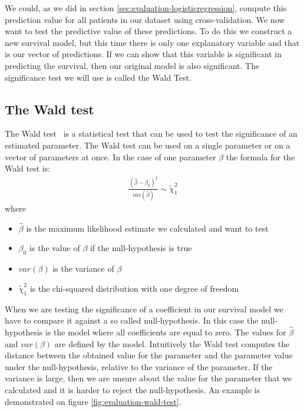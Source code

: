  We could, as we did in section \ref{sec:evaluation-logisticregression}, compute this prediction value for all patients in our dataset using cross-validation. We now want to test the predictive value of these predictions. To do this we construct a new survival model, but this time there is only one explanatory variable and that is our vector of predictions. If we can show that this variable is significant in predicting the survival, then our original model is also significant. The significance test we will use is called the Wald Test.
 
 \subsection{The Wald test}
 \label{subsec:evaluation-wald-test}
The Wald test~\cite{wikiwald} is a statistical test that can be used to test the significance of an estimated parameter. The Wald test can be used on a single parameter or on a vector of parameters at once. In the case of one parameter $\beta$ the formula for the Wald test is:
\begin{equation}
\begin{split}
\frac{(\hat{\beta}-\beta_{0})^{2}}{var(\hat{\beta})} \sim \tilde{\chi}^{2}_{1}
\end{split}
\end{equation}
where
\begin{itemize}
	\item $\hat{\beta}$ is the maximum likelihood estimate we calculated and want to test
	\item $\beta_{0}$ is the value of $\beta$ if the null-hypothesis is true
	\item $var(\beta)$ is the variance of $\beta$
	\item $\tilde{\chi}^{2}_{1}$ is the chi-squared distribution with one degree of freedom
\end{itemize}
When we are testing the significance of a coefficient in our survival model we have to compare it against a so called null-hypothesis. In this case the null-hypothesis is the model where all coefficients are equal to zero. The values for $\hat{\beta}$ and $var(\beta)$ are defined by the model. Intuitively the Wald test computes the distance between the obtained value for the parameter and the parameter value under the null-hypothesis, relative to the variance of the parameter. If the variance is large, then we are unsure about the value for the parameter that we calculated and it is harder to reject the null-hypothesis. An example is demonstrated on figure \ref{fig:evaluation-wald-test}. \\ \\
